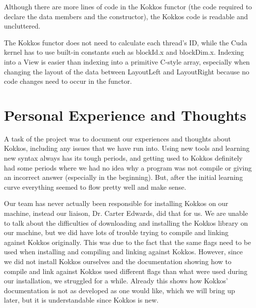 Although there are more lines of code in the Kokkos functor (the code required to
declare the data members and the constructor), the Kokkos code is readable and
uncluttered.

The Kokkos functor does not need to calculate each thread's ID, while the Cuda
kernel has to use built-in constants such as blockId.x and  blockDim.x.
Indexing into a View is easier than indexing into a primitive C-style array,
especially when changing the layout of the data between LayoutLeft and
LayoutRight because no code changes need to occur in the functor.

\section{Personal Experience and Thoughts}
A task of the project was to document our experiences and thoughts about Kokkos,
including any issues that we have run into. Using new tools and learning new
syntax always has its tough periods, and getting used to Kokkos definitely had
some periods where we had no idea why a program was not compile or giving an
incorrect answer (especially in the beginning). But, after the initial learning
curve everything seemed to flow pretty well and make sense. 

Our team has never actually been responsible for installing Kokkos on our
machine, instead our liaison, Dr. Carter Edwards, did that for us. We are unable
to talk about the difficulties of downloading and installing the Kokkos library
on our machine, but we did have lots of trouble trying to compile and linking
against Kokkos originally. This was due to the fact that the same flags need to
be used when installing and compiling and linking against Kokkos. However, since
we did not install Kokkos ourselves and the documentation showing how to compile
and link against Kokkos used different flags than what were used during our
installation, we struggled for a while. Already this shows how Kokkos'
documentation is not as developed as one would like, which we will bring up
later, but it is understandable since Kokkos is new. 

